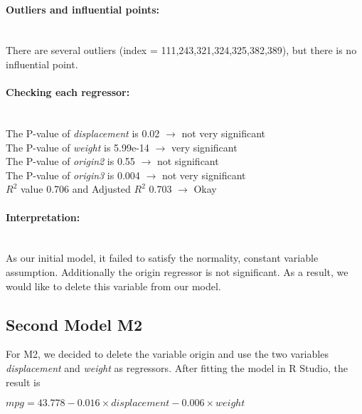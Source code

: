\documentclass[12pt]{article}
\begin{document}
\paragraph{Outliers and influential points:}~{}
\\There are several outliers (index = 111,243,321,324,325,382,389), but there is no influential point.
\\

\paragraph{Checking each regressor:}~{}\\
The P-value of \textit{displacement} is 0.02 $\longrightarrow$ not very significant\\
The P-value of \textit{weight} is 5.99e-14 $\longrightarrow$ very significant\\
The P-value of \textit{origin2} is 0.55 $\longrightarrow$ not significant\\
The P-value of \textit{origin3} is 0.004 $\longrightarrow$ not very significant\\
$R^2$ value 0.706 and Adjusted $R^2$  0.703  $\longrightarrow$ Okay

\paragraph{Interpretation:}~{}\\
As our initial model, it failed to satisfy the normality, constant variable assumption. Additionally the origin regressor is not significant. As a result, we would like to delete this variable from our model.




\subsection{Second Model M2}
For M2, we decided to delete the variable origin and use the two variables \textit{displacement} and \textit{weight} as regressors.
After fitting the model in R Studio, the result is 
\begin{center}
$ mpg = 43.778 - 0.016 \times displacement - 0.006 \times weight $
\end{center}
\end{document}

